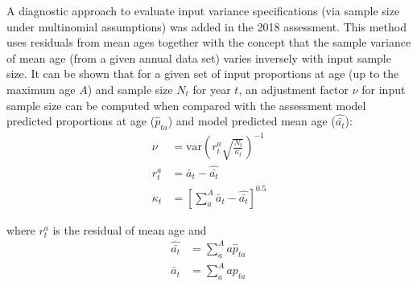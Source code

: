 \documentclass[11pt,
  english,
  a4paper,
]{article}
\begin{document}
\leavevmode\tagmcend\tagstructend\par


A diagnostic approach to evaluate input variance specifications (via sample size under multinomial assumptions) was added in the 2018 assessment. This method uses residuals from mean ages together with the concept that the sample variance of mean age (from a given annual data set) varies inversely with input sample size. It can be shown that for a given set of input proportions at age (up to the maximum age {\(A\)\leavevmode\tagmcend\tagstructend}) and sample size {\(N_t\)\leavevmode\tagmcend\tagstructend} for year {\(t\)\leavevmode\tagmcend\tagstructend}, an adjustment factor {\(\nu\)\leavevmode\tagmcend\tagstructend} for input sample size can be computed when compared with the assessment model predicted proportions at age ({\(\hat p_{ta}\)\leavevmode\tagmcend\tagstructend}) and model predicted mean age ({\(\hat{\bar{a_t}}\)\leavevmode\tagmcend\tagstructend}): \begin{align}
\nu   &= \text{var}\left( r^a_t \sqrt{\frac{N_t}{\kappa_t} }\right)^{-1} \\
r^a_t &= \bar a_t - \hat{\bar{a_t}}                                      \\
\kappa_t &= \left[ \sum_a^A {\bar a_t - \hat{\bar{a_t}}} \right]^{0.5}
\end{align}

\leavevmode\tagmcend\tagstructend\par


where {\(r^a_t\)\leavevmode\tagmcend\tagstructend} is the residual of mean age and \begin{align}
\hat{\bar{a_t}} &= \sum_a^A{a \hat p_{ta}}\, \\
{\bar a_t}      &= \sum_a^A{a p_{ta}}\, 
\end{align}

\leavevmode\tagmcend\tagstructend\par

\end{document}
